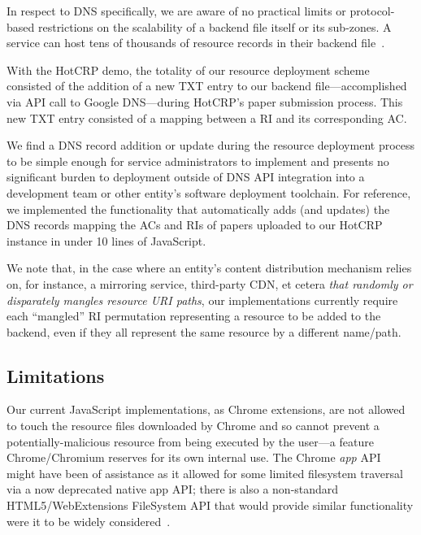 In respect to DNS specifically, we are aware of no practical limits or
protocol-based restrictions on the scalability of a backend file itself or its
sub-zones. A service can host tens of thousands of resource records in their
backend file~\cite{DNS1, DNS2}.

With the HotCRP demo, the totality of our resource deployment scheme consisted
of the addition of a new TXT entry to our backend file---accomplished via API
call to Google DNS---during HotCRP's paper submission process. This new TXT
entry consisted of a mapping between a RI and its corresponding AC.

We find a DNS record addition or update during the resource deployment process
to be simple enough for service administrators to implement and presents no
significant burden to deployment outside of DNS API integration into a
development team or other entity's software deployment toolchain. For reference,
we implemented the functionality that automatically adds (and updates) the DNS
records mapping the ACs and RIs of papers uploaded to our HotCRP instance in
under 10 lines of JavaScript.

We note that, in the case where an entity's content distribution mechanism
relies on, for instance, a mirroring service, third-party CDN, et cetera
\emph{that randomly or disparately mangles resource URI paths}, our
implementations currently require each ``mangled'' RI permutation representing a
resource to be added to the backend, even if they all represent the same
resource by a different name/path.

\subsection{Limitations}


Our current JavaScript implementations, as Chrome extensions, are not allowed to
touch the resource files downloaded by Chrome and so cannot prevent a
potentially-malicious resource from being executed by the user---a feature
Chrome/Chromium reserves for its own internal use. The Chrome \textit{app}
API~\cite{AppAPI} might have been of assistance as it allowed for some limited
filesystem traversal via a now deprecated native app API; there is also a
non-standard HTML5/WebExtensions FileSystem API that would provide similar
functionality were it to be widely considered~\cite{deadSpec}.


